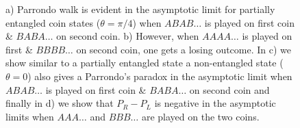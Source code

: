 \documentclass[english,aps,pra,amsmath,amssymb,showpacs,notitlepage,onecolumn]{revtex4-1}
\begin{document}
\begin{figure}[t]
 \centering {}
 \centering    {}
 \centering    {}
 \centering    {}
 \caption{a) Parrondo walk is evident in the asymptotic limit for partially entangled coin states ($\theta=\pi/4$) when $ABAB\ldots$ is played on first coin \& $BABA\ldots$ on second coin. b) However, when $AAAA\ldots$ is played on first \& $BBBB\ldots$ on second coin, one gets a losing outcome.  In c) we show similar to a partially entangled state a non-entangled state ($\theta=0$) also gives a Parrondo's paradox in the asymptotic limit when $ABAB\ldots$ is played on first coin \& $BABA\ldots$ on second coin and finally in d) we show that $P_R-P_L$ is negative in the asymptotic limits when $AAA\ldots$ and $BBB\ldots$ are played on the two coins.}\label{result}
\end{figure}
\end{document}
